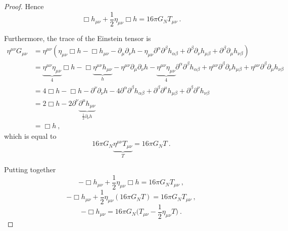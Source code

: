 \begin{proof}
        Hence 
        \begin{equation*}
            \Box h_{\mu\nu} + \frac{1}{2} \eta_{\mu\nu} \Box h = 16 \pi G_N T_{\mu\nu} ~.
        \end{equation*} 

        Furthermore, the trace of the Einstein tensor is 
        \begin{equation*}
        \begin{aligned}
            \eta^{\mu\nu} G_{\mu\nu} & = \eta^{\mu\nu} (\eta_{\mu\nu} \Box h - \Box h_{\mu\nu} - \partial_\mu \partial_\nu h - \eta_{\mu\nu} \partial^\alpha \partial^\beta h_{\alpha\beta} + \partial^\beta \partial_\nu h_{\mu\beta} + \partial^\beta \partial_\mu h_{\nu\beta}) \\ & = \underbrace{\eta^{\mu\nu}\eta_{\mu\nu}}_4 \Box h - \Box \underbrace{\eta^{\mu\nu} h_{\mu\nu}}_h - \eta^{\mu\nu}\partial_\mu \partial_\nu h - \underbrace{\eta^{\mu\nu} \eta_{\mu\nu}}_4 \partial^\alpha \partial^\beta h_{\alpha\beta} + \eta^{\mu\nu} \partial^\beta \partial_\nu h_{\mu\beta} + \eta^{\mu\nu} \partial^\beta \partial_\mu h_{\nu\beta} \\ & = 4 \Box h - \Box h - \partial^\nu \partial_\nu h - 4 \partial^\alpha \partial^\beta h_{\alpha\beta} + \partial^\beta \partial^\mu h_{\mu\beta} + \partial^\beta \partial^\nu h_{\nu\beta} \\ & = 2 \Box h - 2 \partial^\nu \underbrace{\partial^\mu h_{\mu\nu}}_{\frac{1}{2} \partial_\nu h} \\ & = \Box h ~,
        \end{aligned}
        \end{equation*}
        which is equal to 
        \begin{equation*}
            16 \pi G_N \underbrace{\eta^{\mu\nu} T_{\mu\nu}}_T = 16 \pi G_N T ~.
        \end{equation*}

        Putting together
        \begin{equation*}
            - \Box h_{\mu\nu} + \frac{1}{2} \eta_{\mu\nu} \Box h = 16 \pi G_N T_{\mu\nu} ~,
        \end{equation*}
        \begin{equation*}
            - \Box h_{\mu\nu} + \frac{1}{2} \eta_{\mu\nu} (16 \pi G_N T) = 16 \pi G_N T_{\mu\nu} ~,
        \end{equation*}
        \begin{equation*}
            - \Box h_{\mu\nu} = 16 \pi G_N \Big ( T_{\mu\nu} - \frac{1}{2} \eta_{\mu\nu} T) ~.
        \end{equation*}
    \end{proof}

